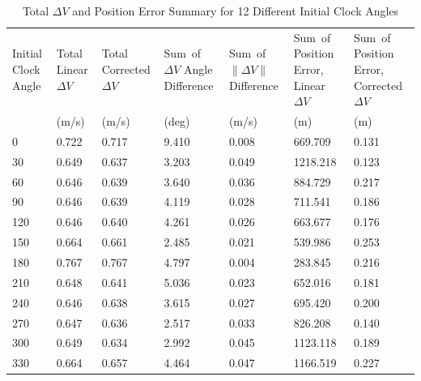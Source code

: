 \documentclass[a4paper]{article}
\begin{document}
\begin{table}[h] 
	\begin{center}
		\begin{tabular}{p{0.9 cm} p{0.8 cm} p{1.2 cm} p{1 cm} p{1 cm} p{1.3cm} p{1.3cm}}
			\toprule
			Initial Clock \mbox{Angle} & Total \mbox{Linear} \(\Delta V\) & Total \mbox{Corrected} \(\Delta V\) & \mbox{Sum of} \(\Delta V\) Angle Difference & \mbox{Sum of} \(\|\Delta V \|\) Difference & \mbox{Sum of} Position Error, Linear \(\Delta V\) & \mbox{Sum of} Position Error, \mbox{Corrected} \(\Delta V\)\\
			& (m/s) & (m/s) & (deg) & (m/s) & (m) & (m) \\
			\midrule
			0	& 0.722	& 0.717	& 9.410	& 0.008	& 669.709	& 0.131 \\
			30	& 0.649	& 0.637	& 3.203	& 0.049	& 1218.218	& 0.123 \\
			60	& 0.646	& 0.639	& 3.640	& 0.036	& 884.729	& 0.217 \\
			90	& 0.646	& 0.639	& 4.119	& 0.028	& 711.541	& 0.186 \\
			120	& 0.646	& 0.640	& 4.261	& 0.026	& 663.677	& 0.176 \\
			150	& 0.664	& 0.661	& 2.485	& 0.021	& 539.986	& 0.253 \\
			180	& 0.767	& 0.767	& 4.797	& 0.004	& 283.845	& 0.216 \\
			210	& 0.648	& 0.641	& 5.036	& 0.023	& 652.016	& 0.181 \\
			240	& 0.646	& 0.638	& 3.615	& 0.027	& 695.420	& 0.200 \\
			270	& 0.647	& 0.636	& 2.517	& 0.033	& 826.208	& 0.140 \\
			300	& 0.649	& 0.634	& 2.992	& 0.045	& 1123.118	& 0.189 \\
			330	& 0.664	& 0.657	& 4.464	& 0.047	& 1166.519	& 0.227 \\
			\bottomrule
		\end{tabular}
		\caption{Total \(\Delta V\) and Position Error Summary for 12 Different Initial Clock Angles}
		\label{tab:Results_2}
	\end{center}
\end{table}
\end{document}
